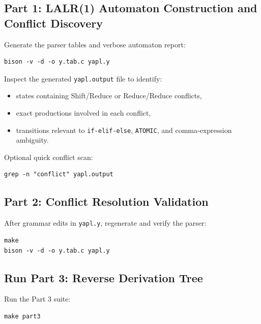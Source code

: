 \documentclass[a4paper,12pt]{article}
\begin{document}
\subsection{Part 1: LALR(1) Automaton Construction and Conflict Discovery}
Generate the parser tables and verbose automaton report:
\begin{lstlisting}
bison -v -d -o y.tab.c yapl.y
\end{lstlisting}

Inspect the generated \texttt{yapl.output} file to identify:
\begin{itemize}
    \item states containing Shift/Reduce or Reduce/Reduce conflicts,
    \item exact productions involved in each conflict,
    \item transitions relevant to \texttt{if-elif-else}, \texttt{ATOMIC}, and comma-expression ambiguity.
\end{itemize}

Optional quick conflict scan:
\begin{lstlisting}
grep -n "conflict" yapl.output
\end{lstlisting}

\subsection{Part 2: Conflict Resolution Validation}
After grammar edits in \texttt{yapl.y}, regenerate and verify the parser:
\begin{lstlisting}
make
bison -v -d -o y.tab.c yapl.y
\end{lstlisting}


\subsection{Run Part 3: Reverse Derivation Tree}
Run the Part 3 suite:
\begin{lstlisting}
make part3
\end{lstlisting}
\end{document}
